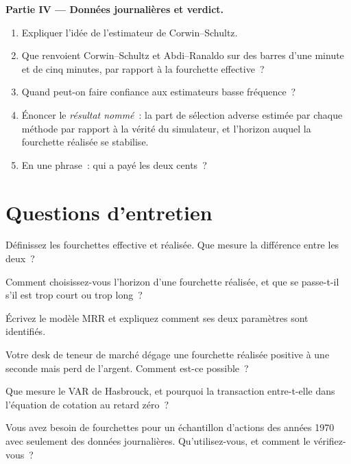 \begin{problem}
\medskip\noindent\textbf{Partie IV --- Données journalières et verdict.}
\begin{enumerate}[resume]
\item Expliquer l'idée de l'estimateur de Corwin--Schultz.
\item Que renvoient Corwin--Schultz et Abdi--Ranaldo sur des barres d'une minute et de cinq minutes, par rapport à la fourchette effective~?
\item Quand peut-on faire confiance aux estimateurs basse fréquence~?
\item Énoncer le \emph{résultat nommé}~: la part de sélection adverse estimée par chaque méthode par rapport à la vérité du simulateur, et l'horizon auquel la
fourchette réalisée se stabilise.
\item En une phrase~: qui a payé les deux cents~?
\end{enumerate}
\end{problem}

\section{Questions d'entretien}

\begin{interviewq}\label{iq:mx:decomposing-the-spread:1}
Définissez les fourchettes effective et réalisée. Que mesure la différence entre les deux~?
\end{interviewq}

\begin{interviewq}\label{iq:mx:decomposing-the-spread:2}
Comment choisissez-vous l'horizon d'une fourchette réalisée, et que se passe-t-il s'il est trop court ou trop long~?
\end{interviewq}

\begin{interviewq}\label{iq:mx:decomposing-the-spread:3}
Écrivez le modèle MRR et expliquez comment ses deux paramètres sont identifiés.
\end{interviewq}

\begin{interviewq}\label{iq:mx:decomposing-the-spread:4}
Votre desk de teneur de marché dégage une fourchette réalisée positive à une seconde mais perd de l'argent. Comment est-ce possible~?
\end{interviewq}

\begin{interviewq}\label{iq:mx:decomposing-the-spread:5}
Que mesure le VAR de Hasbrouck, et pourquoi la transaction entre-t-elle dans l'équation de cotation au retard zéro~?
\end{interviewq}

\begin{interviewq}\label{iq:mx:decomposing-the-spread:6}
Vous avez besoin de fourchettes pour un échantillon d'actions des années 1970 avec seulement des données journalières. Qu'utilisez-vous, et comment le vérifiez-vous~?
\end{interviewq}
